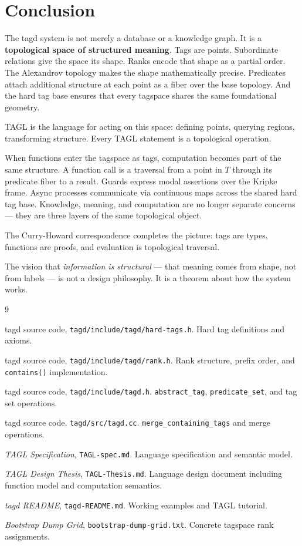 \documentclass{article}
\begin{document}
\section{Conclusion}

The tagd system is not merely a database or a knowledge graph. It is a
\textbf{topological space of structured meaning}. Tags are points. Subordinate
relations give the space its shape. Ranks encode that shape as a partial order.
The Alexandrov topology makes the shape mathematically precise. Predicates
attach additional structure at each point as a fiber over the base topology.
And the hard tag base ensures that every tagspace shares the same foundational
geometry.

TAGL is the language for acting on this space: defining points, querying
regions, transforming structure. Every TAGL statement is a topological
operation.

When functions enter the tagspace as tags, computation becomes part of the
same structure. A function call is a traversal from a point in $T$ through
its predicate fiber to a result. Guards express modal assertions over the
Kripke frame. Async processes communicate via continuous maps across the
shared hard tag base. Knowledge, meaning, and computation are no longer
separate concerns --- they are three layers of the same topological object.

The Curry-Howard correspondence completes the picture: tags are types,
functions are proofs, and evaluation is topological traversal.

The vision that \emph{information is structural} --- that meaning comes from
shape, not from labels --- is not a design philosophy. It is a theorem about
how the system works.

\begin{thebibliography}{9}

tagd source code, \texttt{tagd/include/tagd/hard-tags.h}.
Hard tag definitions and axioms.

tagd source code, \texttt{tagd/include/tagd/rank.h}.
Rank structure, prefix order, and \texttt{contains()} implementation.

tagd source code, \texttt{tagd/include/tagd.h}.
\texttt{abstract\_tag}, \texttt{predicate\_set}, and tag set operations.

tagd source code, \texttt{tagd/src/tagd.cc}.
\texttt{merge\_containing\_tags} and merge operations.

\textit{TAGL Specification}, \texttt{TAGL-spec.md}.
Language specification and semantic model.

\textit{TAGL Design Thesis}, \texttt{TAGL-Thesis.md}.
Language design document including function model and computation semantics.

\textit{tagd README}, \texttt{tagd-README.md}.
Working examples and TAGL tutorial.

\textit{Bootstrap Dump Grid}, \texttt{bootstrap-dump-grid.txt}.
Concrete tagspace rank assignments.

\end{thebibliography}
\end{document}
